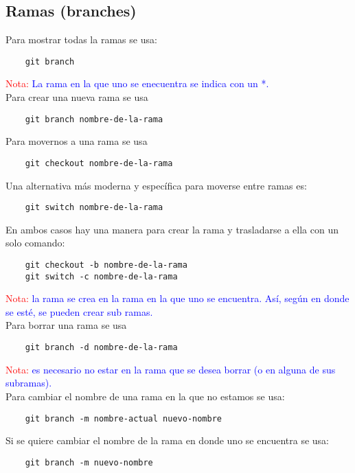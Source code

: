 \documentclass[10pt,oneside]{article}
\begin{document}
\begin{multicols}{2}
\section{Ramas (branches)} Para mostrar todas la ramas se usa: 
\begin{verbatim}
    git branch
\end{verbatim}
\textcolor{red}{Nota:} \textcolor{blue}{La rama en la que uno se enecuentra se indica con un *.}\\ \newline
Para crear una nueva rama se usa
\begin{verbatim}
    git branch nombre-de-la-rama
\end{verbatim}
Para movernos a una rama se usa \begin{verbatim}
    git checkout nombre-de-la-rama
\end{verbatim}
Una alternativa más moderna y específica para moverse entre ramas es:
\begin{verbatim}
    git switch nombre-de-la-rama
\end{verbatim}
En ambos casos hay una manera para crear la rama y trasladarse a ella con un solo comando: 
\begin{verbatim}
    git checkout -b nombre-de-la-rama
    git switch -c nombre-de-la-rama
\end{verbatim}
\textcolor{red}{Nota:} \textcolor{blue}{la rama se crea en la rama en la que uno se encuentra. Así, según en donde se esté, se pueden crear sub ramas.}\\ \newline Para borrar una rama se usa 
\begin{verbatim}
    git branch -d nombre-de-la-rama
\end{verbatim}
\textcolor{red}{Nota:} \textcolor{blue}{es necesario no estar en la rama que se desea borrar (o en alguna de sus subramas).}\\ \newline Para cambiar el nombre de una rama en la que no estamos se usa:
\begin{verbatim}
    git branch -m nombre-actual nuevo-nombre
\end{verbatim}
Si se quiere cambiar el nombre de la rama en donde uno se encuentra se usa:
\begin{verbatim}
    git branch -m nuevo-nombre
\end{verbatim}

\end{multicols}
\end{document}
